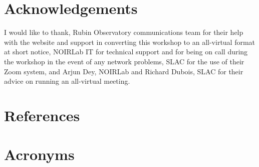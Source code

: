 \documentclass[DM,authoryear,toc]{lsstdoc}
\begin{document}
\section{Acknowledgements}
I would like to thank, Rubin Observatory communications team for their help with the website and support in converting this workshop to an all-virtual format at short notice,  NOIRLab IT for technical support and for being on call during the workshop in the event of any network problems, SLAC for the use of their Zoom system, and Arjun Dey, NOIRLab and Richard Dubois, SLAC for their advice on running an all-virtual meeting.

\appendix
\section{References} 
\label{sec:bib}


\section{Acronyms} \label{sec:acronyms}

\printglossaries
\end{document}

